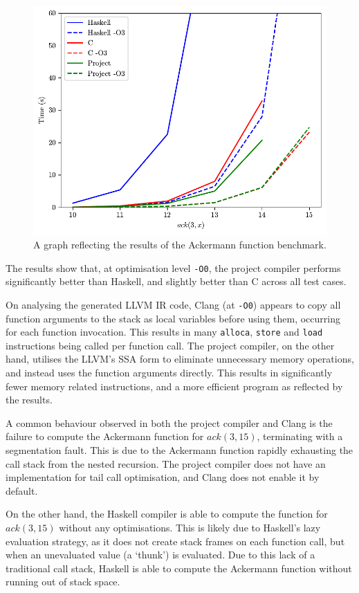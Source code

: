 \begin{figure}[t]
    \includegraphics{Graphics/ackermann-benchmark.pdf}
    \caption{A graph reflecting the results of the Ackermann function benchmark.}
    \label{fig:ackermann-benchmark}
\end{figure}

The results show that, at optimisation level \texttt{-O0}, the
project compiler performs significantly better than Haskell, and slightly better than C across all
test cases.

On analysing the generated LLVM IR code, Clang (at \texttt{-O0}) appears to copy all function
arguments to the stack as local variables before using them, occurring for each function invocation.
This results in many \texttt{alloca}, \texttt{store} and \texttt{load} instructions being called per
function call. The project compiler, on the other hand, utilises the LLVM's SSA form to eliminate
unnecessary memory operations, and instead uses the function arguments directly. This results in
significantly fewer memory related instructions, and a more efficient program as reflected by the
results.

A common behaviour observed in both the project compiler and Clang is the failure to compute the
Ackermann function for $ack(3,15)$, terminating with a segmentation fault. This is due to the
Ackermann function rapidly exhausting the call stack from the nested recursion. The project compiler
does not have an implementation for tail call optimisation, and Clang does not enable it by default.

On the other hand, the Haskell compiler is able to compute the function for $ack(3,15)$ without any
optimisations. This is likely due to Haskell's lazy evaluation strategy, as it does not create stack
frames on each function call, but when an unevaluated value (a `thunk') is evaluated. Due to this
lack of a traditional call stack, Haskell is able to compute the Ackermann function without running
out of stack space.

